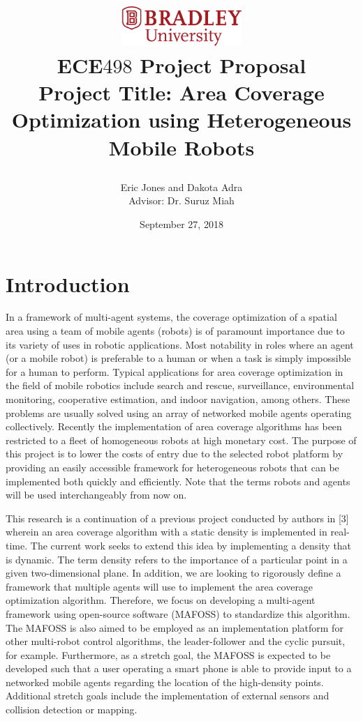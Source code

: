 \documentclass{article}
\title{
\begin{center}
\href{http://www.bradley.edu}{\includegraphics[height=0.6in]{figs/logoBU1-Print}}
\\[0.4cm] %
\Huge \bfseries ECE$498$ Project Proposal 
\\[1.0cm] %
\Huge  Project Title: Area Coverage Optimization using Heterogeneous Mobile Robots 
\\[10.0cm] %
\end{center} %
}
\author{\LARGE Eric Jones and Dakota Adra \\ \LARGE Advisor: Dr. Suruz Miah }
\date{September 27, 2018}
\begin{document}
\maketitle
\newpage
\tableofcontents %
\newpage %

\section{ Introduction}
In a framework of multi-agent systems, the coverage optimization of a spatial area using a team of mobile agents (robots) is of paramount importance due to its variety of uses in robotic applications. Most notability in roles where an agent (or a mobile robot) is preferable to a human or when a task is simply impossible for a human to perform. Typical applications for area coverage optimization in the field of mobile robotics include search and rescue, surveillance, environmental monitoring, cooperative estimation, and indoor navigation, among others. These problems are usually solved using an array of networked mobile agents operating collectively. Recently the implementation of area coverage algorithms has been restricted to a fleet of homogeneous robots at high monetary cost. The purpose of this project is to lower the costs of entry due to the selected robot platform by providing an easily accessible framework for heterogeneous robots that can be implemented both quickly and efficiently. Note that the terms robots and agents will be used interchangeably from now on.

This research is a continuation of a previous project conducted by authors in [3] wherein an area coverage algorithm with a static density is implemented in real-time. The current work seeks to extend this idea by implementing a density that is dynamic.  The term density refers to the importance of a particular point in a given two-dimensional plane. In addition, we are looking to rigorously define a framework that multiple agents will use to implement the area coverage optimization algorithm. Therefore, we focus on developing a multi-agent framework using open-source software (MAFOSS) to standardize this algorithm. The MAFOSS is also aimed to be employed as an implementation platform for other multi-robot control algorithms, the leader-follower and  the cyclic pursuit, for example. Furthermore, as a stretch goal, the MAFOSS is expected to be developed such that a user operating a smart phone is able to provide input to a networked mobile agents regarding the location of the high-density points. Additional stretch goals include the implementation of external sensors and collision detection or mapping.
\end{document}
